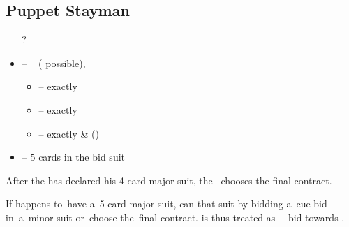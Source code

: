 \subsection{Puppet Stayman}
\label{subsec:puppet-stayman}

 --  -- ?
\begin{itemize}
  \item {} -- \no\  ( possible), \wait
  \begin{itemize}
    \item {} -- exactly 
    \item {} -- exactly 
    \item {} -- exactly  \&  (\so)
  \end{itemize}
  \item {} -- $5$ cards in the bid suit
\end{itemize}

After the \resp\/ has declared his 4-card major suit, the~\opn\/ chooses the final contract.\vspace{1em}

If \opn\/ happens to~have a~5-card major suit, \resp\/ can \settle\/ that suit by bidding a~cue-bid in~a~minor suit
or~choose the~final contract.  is thus treated as~\nat\ \inv\/ bid towards .
